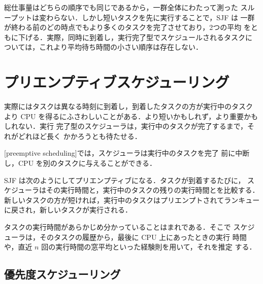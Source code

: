 \documentclass[../main.tex]{subfiles}
\begin{document}
総仕事量はどちらの順序でも同じであるから，一群全体にわたって測った
スループットは変わらない．しかし短いタスクを先に実行することで，SJF は
一群が終わる前のどの時点でもより多くのタスクを完了させており，2つの平均
をともに下げる．実際，同時に到着し，実行完了型でスケジュールされるタスクに
ついては，これより平均待ち時間の小さい順序は存在しない．

\section{プリエンプティブスケジューリング}
\label{sec:l07-preemptive}

実際にはタスクは異なる時刻に到着し，到着したタスクの方が実行中のタスク
より CPU を得るにふさわしいことがある．より短いかもしれず，より重要かもしれない．実行
完了型のスケジューラは，実行中のタスクが完了するまで，それがどれほど長く
かかろうとも待たせる．

\begin{definition}[プリエンプティブスケジューリング]
  [preemptive scheduling]では，スケジューラは実行中のタスクを完了
  前に中断し，CPU を別のタスクに与えることができる．
\end{definition}

SJF は次のようにしてプリエンプティブになる．タスクが到着するたびに，
スケジューラはその実行時間と，実行中のタスクの残りの実行時間とを比較する．
新しいタスクの方が短ければ，実行中のタスクはプリエンプトされてランキュー
に戻され，新しいタスクが実行される．

タスクの実行時間があらかじめ分かっていることはまれである．そこで
スケジューラは，そのタスクの履歴から，最後に CPU 上にあったときの実行
時間や，直近 $n$ 回の実行時間の窓平均といった経験則を用いて，それを推定
する．

\subsection{優先度スケジューリング}
\end{document}
